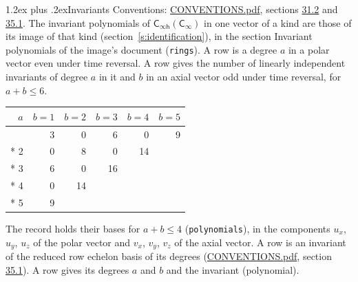 \documentclass[10pt,a4paper]{article}
\makeatletter
\renewcommand\section{\@startsection{section}{1}{\z@}{-3ex plus -1ex minus -.2ex}%
  {1.2ex plus .2ex}{\normalfont\large\sffamily\bfseries\color{parttitle}}}
\numberwithin{equation}{section}
\newcommand{\grp}[1]{\mathsf{#1}}
\makeatother
\begin{document}
\section{Invariants}\label{s:invariants}
Conventions: \href{../../CONVENTIONS.pdf}{CONVENTIONS.pdf}, sections \href{../../CONVENTIONS.pdf\#conv.31.2}{31.2} and \href{../../CONVENTIONS.pdf\#conv.35.1}{35.1}.
The invariant polynomials of $\grp{C_{\infty h}}(\grp{C_{\infty}})$ in one vector of a kind are those of its image of that kind (section~\ref{s:identification}), in the section Invariant polynomials of the image's document (\texttt{rings}).
\leavevmode\label{n:index.degree.polar}\label{n:index.degree.axial}A row is a degree $a$ in a polar vector even under time reversal. A row gives the number of linearly independent invariants of degree $a$ in it and $b$ in an axial vector odd under time reversal, for $a + b \le 6$.
{\small\begin{longtable}{@{}rrrrrr@{}}\toprule
$a$ & $b = 1$ & $b = 2$ & $b = 3$ & $b = 4$ & $b = 5$\\\midrule\endhead
\bottomrule\endfoot\endlastfoot
1 & 3 & 0 & 6 & 0 & 9\\*
2 & 0 & 8 & 0 & 14 & \\*
3 & 6 & 0 & 16 &  & \\*
4 & 0 & 14 &  &  & \\*
5 & 9 &  &  &  & \\
\bottomrule\end{longtable}}
\leavevmode\label{n:local.component.polar}\label{n:local.component.axial}The record holds their bases for $a + b \le 4$ (\texttt{polynomials}), in the components $u_{x}$, $u_{y}$, $u_{z}$ of the polar vector and $v_{x}$, $v_{y}$, $v_{z}$ of the axial vector. \label{n:head.polynomial}A row is an invariant of the reduced row echelon basis of its degrees (\href{../../CONVENTIONS.pdf}{CONVENTIONS.pdf}, section \href{../../CONVENTIONS.pdf\#conv.35.1}{35.1}). A row gives its degrees $a$ and $b$ and the invariant (polynomial).
\end{document}
